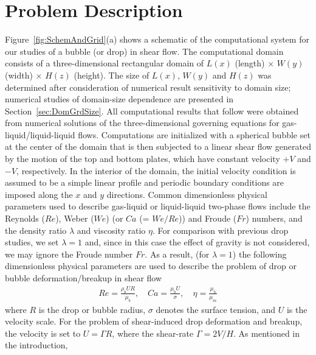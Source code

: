 \documentclass[%
 reprint,
 showkeys,
 amsmath,amssymb,
 aps,
 prfluids,
 onecolumn
]{revtex4-2}
\begin{document}
\section{Problem Description}

Figure~\ref{fig:SchemAndGrid}(a) shows a schematic of the computational system
for our studies of a bubble (or drop) in shear flow.  The computational domain
consists of a three-dimensional rectangular domain of $L(x)$ (length) $\times$
$W(y)$ (width) $\times$ $H(z)$ (height).  The size of $L(x)$, $W(y)$ and $H(z)$
was determined after consideration of numerical result sensitivity to domain
size; numerical studies of domain-size dependence are presented in
Section~\ref{sec:DomGrdSize}.  All computational results that follow were
obtained from numerical solutions of the three-dimensional governing equations
for gas-liquid/liquid-liquid flows.  Computations are initialized with a
spherical bubble set at the center of the domain that is then subjected to a
linear shear flow generated by the motion of the top and bottom plates, which 
have constant velocity $+V$ and $-V$, respectively.  In the interior of the
domain, the initial velocity condition is assumed to be a simple linear profile
and periodic boundary conditions are imposed along the $x$ and $y$ directions.
Common dimensionless physical parameters used to describe gas-liquid or
liquid-liquid two-phase flows include the Reynolds ($Re$), Weber ($We$) (or
$Ca$ (= $We/Re$)) and Froude ($Fr$) numbers, and the density ratio $\lambda$
and viscosity ratio $\eta$.  For comparison with previous drop studies, we set
$\lambda=1$ and, since in this case the effect of gravity is not considered, we
may ignore the Froude number $Fr$.  As a result, (for $\lambda=1$) the
following dimensionless physical parameters are used to describe the problem of
drop or bubble deformation/breakup in shear flow
%
\begin{eqnarray}\label{dimensonless}
  Re = \frac{\rho_{b}UR}{\mu_{b}}, \quad
  Ca = \frac{\mu_{b}U}{\sigma}, \quad
  \eta = \frac{\mu_{b}}{\mu_{m}}
\end{eqnarray} 
%
where $R$ is the drop or bubble radius, $\sigma$ denotes the surface tension,
and $U$ is the velocity scale. For the problem of shear-induced drop
deformation and breakup, the velocity is set to $U = \mathit{\Gamma} R$, where
the shear-rate $\mathit{\Gamma} = 2V/H$.  As mentioned in the introduction,
\end{document}
